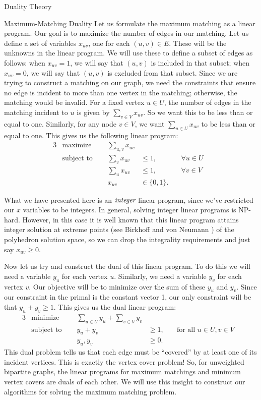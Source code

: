 \begin{section}{Duality Theory}
\begin{subsection}{Maximum-Matching Duality}
	Let us formulate the maximum matching as a linear program. Our goal is to maximize the number 
	of edges in our matching. Let us define a set of variables $x_{uv}$, one for each $(u,v)\in E$. 
	These will be the unknowns in the linear program. We will use these to define a subset of 
	edges as follows: when $x_{uv} = 1$, we will say that $(u,v)$ is included in that subset; 
	when $x_{uv} = 0$, we will say that $(u,v)$ is excluded from that subset. Since we are trying 
	to construct a matching on our graph, we need the constraints that ensure no edge is incident to 
	more than one vertex in the matching; otherwise, the matching would be invalid. For a fixed 
	vertex $u\in U$, the number of edges in the matching incident 
	to $u$ is given by $\sum_{v\in V} x_{uv}$. So we want this to be less than or equal to one. 
	Similarly, for any node $v\in V$, we want $\sum_{u\in U} x_{uv}$ to be less than or equal to 
	one. This gives us the following linear program:
	\begin{alignat}{3}
		& \text{maximize } & \sum_{u,v} x_{uv}& \\
		& \text{subject to } \quad & \sum_{v} x_{uv} & \leq 1, & \quad \forall u\in U& \\
				     &\quad & \sum_{u} x_{uv} & \leq 1, & \quad \forall v\in V & \\
				&& x_{uv} & \in \{0,1\}.
	\end{alignat}

	What we have presented here is an $\emph{integer}$ linear program, since we've restricted our 
	$x$ variables to be integers. In general, solving integer linear programs is NP-hard. However, 
	in this case it is well known that this linear program attains integer solution at extreme points
	(see Birkhoff \cite{birkhoff1946} and von Neumann \cite{vN53})
	of the polyhedron solution space, so we can drop the integrality requirements and just say 
	$x_{uv} \geq 0$.

	Now let us try and construct the dual of this linear program. To do this we will need a variable 
	$y_u$ for each vertex $u$. Similarly, we need a variable $y_v$ for each vertex $v$. Our 
	objective will be to minimize over the sum of these $y_u$ and $y_v$. Since our constraint 
	in the primal is the constant vector 1, our only constraint will be that $y_u + y_v \geq 1$. 
	This gives us the dual linear program:
	\begin{alignat}{3}
		& \text{minimize } & \sum_{u\in U} y_u + \sum_{v\in V} y_v& \\
		& \text{subject to } \quad & y_u + y_v & \geq 1, & \quad \text{for all } u\in U,v\in V & \\
				    && y_u,y_v & \geq 0.
	\end{alignat}
	This dual problem tells us that each edge must be ``covered'' by at least one of its incident 
	vertices. This is exactly the vertex cover problem! So, for unweighted bipartite graphs, the 
	linear programs for maximum matchings and minimum vertex covers are duals of each other. 
	We will use this insight to construct our algorithms for solving the maximum matching problem. 


\end{subsection}
\end{section}
